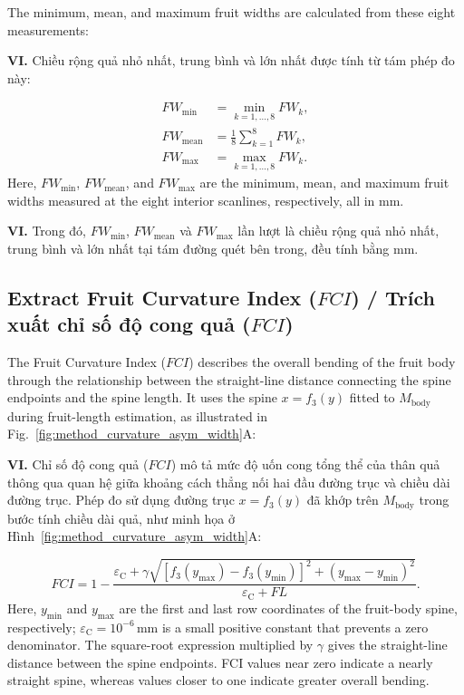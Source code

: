 \documentclass[final,1p,11pt,longtitle]{elsarticle}
\newenvironment{viet}{\par\smallskip\begingroup\color{viColor}\noindent\textbf{VI. }\ignorespaces}{\par\endgroup\smallskip}
\begin{document}
The minimum, mean, and maximum fruit widths are calculated from these eight
measurements:

\begin{viet}
Chiều rộng quả nhỏ nhất, trung bình và lớn nhất được tính từ tám phép đo này:
\end{viet}

\begin{align}
    FW_{\min} &= \min_{k=1,\ldots,8} FW_k, \\
    FW_{\mathrm{mean}} &= \frac{1}{8}\sum_{k=1}^{8} FW_k, \\
    FW_{\max} &= \max_{k=1,\ldots,8} FW_k.
\end{align}
Here, $FW_{\min}$, $FW_{\mathrm{mean}}$, and $FW_{\max}$ are the minimum, mean, and maximum fruit widths measured at the eight interior scanlines, respectively, all in mm.

\begin{viet}
Trong đó, $FW_{\min}$, $FW_{\mathrm{mean}}$ và $FW_{\max}$ lần lượt là chiều rộng quả nhỏ nhất, trung bình và lớn nhất tại tám đường quét bên trong, đều tính bằng mm.
\end{viet}


\subsection*{Extract Fruit Curvature Index ($FCI$) / {\color{viColor} Trích xuất chỉ số độ cong quả ($FCI$)}}
The Fruit Curvature Index ($FCI$) describes the overall bending of the fruit body through the relationship between the straight-line distance connecting the spine endpoints and the spine length. It uses the spine $x=f_3(y)$ fitted to $M_{\mathrm{body}}$ during fruit-length estimation, as illustrated in Fig.~\ref{fig:method_curvature_asym_width}A:

\begin{viet}
Chỉ số độ cong quả ($FCI$) mô tả mức độ uốn cong tổng thể của thân quả thông qua quan hệ giữa khoảng cách thẳng nối hai đầu đường trục và chiều dài đường trục. Phép đo sử dụng đường trục $x=f_3(y)$ đã khớp trên $M_{\mathrm{body}}$ trong bước tính chiều dài quả, như minh họa ở Hình~\ref{fig:method_curvature_asym_width}A:
\end{viet}

\begin{equation}
 FCI=1-\frac{\varepsilon_{\mathrm{C}}+\gamma\sqrt{[f_3(y_{\max})-f_3(y_{\min})]^2+(y_{\max}-y_{\min})^2}}{\varepsilon_{\mathrm{C}}+FL}.
\end{equation}
Here, $y_{\min}$ and $y_{\max}$ are the first and last row coordinates of the fruit-body spine, respectively; $\varepsilon_{\mathrm{C}}=10^{-6}\,\mathrm{mm}$ is a small positive constant that prevents a zero denominator. The square-root expression multiplied by $\gamma$ gives the straight-line distance between the spine endpoints. FCI values near zero indicate a nearly straight spine, whereas values closer to one indicate greater overall bending.
\end{document}
